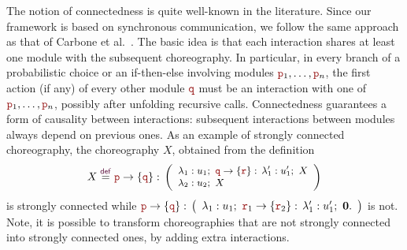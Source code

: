 %
The notion of connectedness is quite well-known in the
literature. Since our framework is based on synchronous communication,
we follow the same approach as that of Carbone et
al.~\cite{CHY12}. The basic idea is that each interaction shares at
least one module with the subsequent choreography. In particular, in
every branch of a probabilistic choice or an if-then-else involving
modules $\nr_1, \ldots, \nr_n$, the first action (if any) of every
other module $\nrr$ must be an interaction with one of
$\nr_1, \ldots, \nr_n$, possibly after unfolding recursive
calls. Connectedness guarantees a form of causality between
interactions: subsequent interactions between modules always depend on
previous ones.
%
As an example of strongly connected choreography, the choreography
$X$, obtained from the definition
\begin{displaymath}\small
  X\defrec
  \interactBase{\nr}{\nrr}:\,
  \left(
    \begin{array}{l}
      \lambda_1: u_1;\ \interactBase{\nrr}{\nrrr}:\, \lambda_1':u_1';\ X    \\
      \lambda_2: u_2;\ X
    \end{array}
  \right)
\end{displaymath}
%
is strongly connected while 
% 
$
\interactBase{\nr}{\nrr}:\,
\left(
  \begin{array}{l}
    \lambda_1: u_1;\ \interactBase{\nrrr_1}{\nrrr_2}:\, \lambda_1':u_1';\ \CEnd.
  \end{array}
\right) $ is not. Note, it is possible to transform choreographies
that are not strongly connected into strongly connected ones, by
adding extra interactions.
% 


\smallskip

